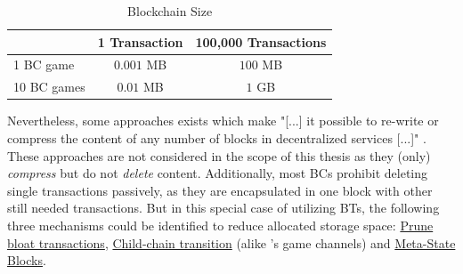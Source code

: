 \begin{table}
	\centering
	\begin{tabularx}{0.59\textwidth}{ l | c | c }
		& 1 Transaction & 100,000 Transactions \\ \hline
		1 \gls{BC} game & $0.001$ MB & $100$ MB \\ \hline
		10 \gls{BC} games & $0.01$ MB & $1$ GB \\
		\hline
	\end{tabularx}
	\caption{Blockchain Size}
	\label{tbl:BloatblocksBlockchainSize}
\end{table}
Nevertheless, some approaches exists which make "[...] it possible to re-write or compress the content of any number of blocks in decentralized services [...]" \cite[111]{Ateniese.2017}.
These approaches are not considered in the scope of this thesis as they (only) \textit{compress} but do not \textit{delete} content.
Additionally, most \gls{BC}s prohibit deleting single transactions passively, as they are encapsulated in one block with other still needed transactions.
But in this special case of utilizing \gls{BT}s, the following three mechanisms could be identified to reduce allocated storage space:
\hyperref[sec:PruneProcedure]{Prune bloat transactions}, \hyperref[sec:CcTransition]{Child-chain transition}
(alike \citet{Kraft.2016}'s game channels) and \hyperref[sec:MeatState]{Meta-State Blocks}.


 
